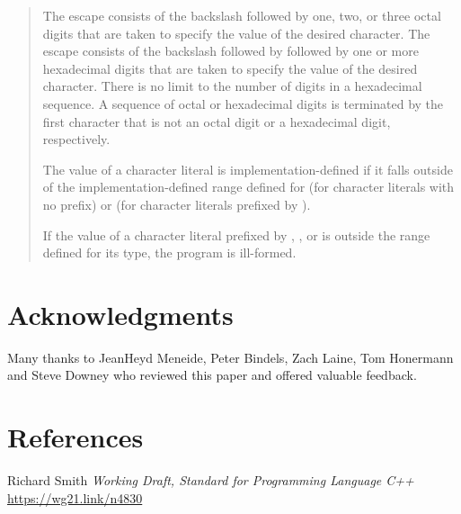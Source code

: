 \documentclass{wg21}
\begin{document}
\begin{quote}
The escape
 consists of the backslash followed by one,
two, or three octal digits that are taken to specify the value of the
desired character. The escape
consists of the backslash followed by  followed by one or more
hexadecimal digits that are taken to specify the value of the desired
character. There is no limit to the number of digits in a hexadecimal
sequence. A sequence of octal or hexadecimal digits is terminated by the
first character that is not an octal digit or a hexadecimal digit,
respectively.

\begin{removedblock}
The value of a character literal is implementation-defined if it falls outside
of the implementation-defined
range defined for  (for character literals with no prefix) or
 (for character literals prefixed by ).

\begin{note}
	If the value of a character literal prefixed by
	, , or 
	is outside the range defined for its type, 
	the program is ill-formed.
\end{note}
\end{removedblock}



\end{quote}

\section{Acknowledgments}

Many thanks to JeanHeyd Meneide, Peter Bindels, Zach Laine, Tom Honermann and Steve Downey who reviewed this paper and offered valuable feedback.


\section{References}
\renewcommand{\section}[2]{}%
\begin{thebibliography}{9}

Richard Smith
\emph{Working Draft, Standard for Programming Language C++}\newline
\url{https://wg21.link/n4830}

\end{thebibliography}
\end{document}
